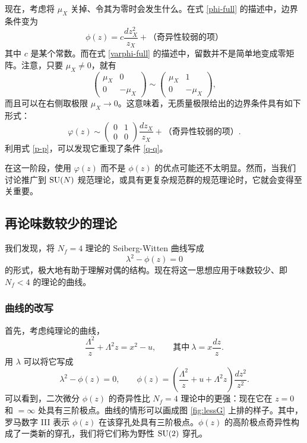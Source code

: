现在，考虑将 $\mu_X$ 关掉、令其为零时会发生什么。在式 \eqref{phi-full} 的描述中，边界条件变为
\begin{equation}
\phi(z)=c\frac{dz_X^2}{z_X}+\text{（奇异性较弱的项）}\label{q-q}
\end{equation}
其中 $c$ 是某个常数。而在式 \eqref{varphi-full} 的描述中，留数并不是简单地变成零矩阵。注意，只要 $\mu_X\neq0$，就有
\begin{equation}
\begin{pmatrix}
\mu_X&0\\
0&-\mu_X
\end{pmatrix}
\sim
\begin{pmatrix}
\mu_X&1\\
0&-\mu_X
\end{pmatrix},
\end{equation}
而且可以在右侧取极限 $\mu_X\to0$。这意味着，无质量极限给出的边界条件具有如下形式：
\begin{equation}
\varphi(z)\sim\begin{pmatrix}
0&1\\
0&0
\end{pmatrix}\frac{dz_X}{z_X}+\text{（奇异性较弱的项）}.
\end{equation}
利用式 \eqref{p-p}，可以发现它重现了条件 \eqref{q-q}。

在这一阶段，使用 $\varphi(z)$ 而不是 $\phi(z)$ 的优点可能还不太明显。然而，当我们讨论推广到 $\mathop{\mathrm{SU}}(N)$ 规范理论，或具有更复杂规范群的规范理论时，它就会变得至关重要。

\subsection{再论味数较少的理论}\label{sec:less}
我们发现，将 $N_f=4$ 理论的 Seiberg-Witten 曲线写成
\begin{equation}
\lambda^2-\phi(z)=0
\end{equation}
的形式，极大地有助于理解对偶的结构。现在将这一思想应用于味数较少、即 $N_f<4$ 的理论的曲线。

\subsubsection{曲线的改写}
首先，考虑纯理论的曲线，
\begin{equation}
\frac{\Lambda^2}z+\Lambda^2z=x^2-u,\qquad\text{其中}\ \lambda=x\frac{dz}z.
\end{equation}
用 $\lambda$ 可以将它写成
\begin{equation}
\lambda^2-\phi(z)=0,\qquad\phi(z)=(\frac{\Lambda^2}z+u+\Lambda^2z)\frac{dz^2}{z^2}.
\end{equation}
可以看到，二次微分 $\phi(z)$ 的奇异性比 $N_f=4$ 理论中的更强：现在它在 $z=0$ 和 $=\infty$ 处具有三阶极点。曲线的情形可以画成图 \ref{fig:lessG} 上排的样子。其中，罗马数字 III 表示 $\phi(z)$ 在该穿孔处具有三阶极点。$\phi(z)$ 的高阶极点奇异性构成了一类新的穿孔，我们将它们称为野性 $\mathop{\mathrm{SU}}(2)$ 穿孔。

